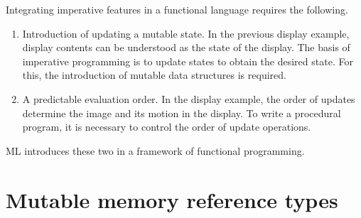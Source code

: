 \documentclass{jbook}
\newcommand{\txt}[2]{#2}
\begin{document}
	Integrating imperative features in a functional language
requires the following.
\begin{enumerate}
\item Introduction of updating a mutable state.
	In the previous display example, display contents can be
understood as the state of the display.
	The basis of imperative programming is to update states to
obtain the desired state.
	For this, the introduction of mutable data structures is
required.
\item A predictable evaluation order.
	In the display example, the order of updates determine the image
and its motion in the display.
	To write a procedural program, it is necessary to control the
order of update operations.
\end{enumerate}
	ML introduces these two in a framework of functional programming.
\fi%

\section{
\txt{変更可能なメモリーセルを表す参照型}
    {Mutable memory reference types}}
\label{sec:tutorialRef}
\end{document}
